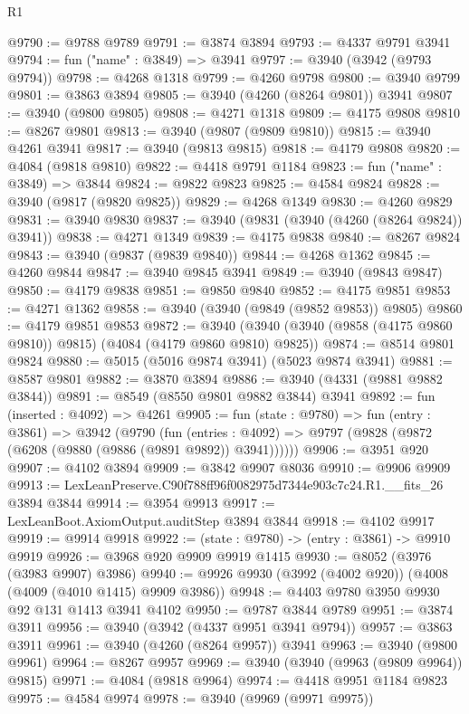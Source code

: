 \begin{lexlean}{R1}
\begin{coremodule}
@9790 := @9788 @9789
@9791 := @3874 @3894
@9793 := @4337 @9791 @3941
@9794 := fun ("name" : @3849) => @3941
@9797 := @3940 (@3942 (@9793 @9794))
@9798 := @4268 @1318
@9799 := @4260 @9798
@9800 := @3940 @9799
@9801 := @3863 @3894
@9805 := @3940 (@4260 (@8264 @9801)) @3941
@9807 := @3940 (@9800 @9805)
@9808 := @4271 @1318
@9809 := @4175 @9808
@9810 := @8267 @9801
@9813 := @3940 (@9807 (@9809 @9810))
@9815 := @3940 @4261 @3941
@9817 := @3940 (@9813 @9815)
@9818 := @4179 @9808
@9820 := @4084 (@9818 @9810)
@9822 := @4418 @9791 @1184
@9823 := fun ("name" : @3849) => @3844
@9824 := @9822 @9823
@9825 := @4584 @9824
@9828 := @3940 (@9817 (@9820 @9825))
@9829 := @4268 @1349
@9830 := @4260 @9829
@9831 := @3940 @9830
@9837 := @3940 (@9831 (@3940 (@4260 (@8264 @9824)) @3941))
@9838 := @4271 @1349
@9839 := @4175 @9838
@9840 := @8267 @9824
@9843 := @3940 (@9837 (@9839 @9840))
@9844 := @4268 @1362
@9845 := @4260 @9844
@9847 := @3940 @9845 @3941
@9849 := @3940 (@9843 @9847)
@9850 := @4179 @9838
@9851 := @9850 @9840
@9852 := @4175 @9851
@9853 := @4271 @1362
@9858 := @3940 (@3940 (@9849 (@9852 @9853)) @9805)
@9860 := @4179 @9851 @9853
@9872 := @3940 (@3940 (@3940 (@9858 (@4175 @9860 @9810)) @9815) (@4084 (@4179 @9860 @9810) @9825))
@9874 := @8514 @9801 @9824
@9880 := @5015 (@5016 @9874 @3941) (@5023 @9874 @3941)
@9881 := @8587 @9801
@9882 := @3870 @3894
@9886 := @3940 (@4331 (@9881 @9882 @3844))
@9891 := @8549 (@8550 @9801 @9882 @3844) @3941
@9892 := fun (inserted : @4092) => @4261
@9905 := fun (state : @9780) =>
  fun (entry : @3861) =>
  @3942
    (@9790
      (fun (entries : @4092) => @9797 (@9828 (@9872 (@6208 (@9880 (@9886 (@9891 @9892)) @3941))))))
@9906 := @3951 @920
@9907 := @4102 @3894
@9909 := @3842 @9907 @8036
@9910 := @9906 @9909
@9913 := LexLeanPreserve.C90f788ff96f0082975d7344e903c7c24.R1.__fits_26 @3894 @3844
@9914 := @3954 @9913
@9917 := LexLeanBoot.AxiomOutput.auditStep @3894 @3844
@9918 := @4102 @9917
@9919 := @9914 @9918
@9922 := (state : @9780) -> (entry : @3861) -> @9910 @9919
@9926 := @3968 @920 @9909 @9919 @1415
@9930 := @8052 (@3976 (@3983 @9907) @3986)
@9940 := @9926 @9930 (@3992 (@4002 @920)) (@4008 (@4009 (@4010 @1415) @9909 @3986))
@9948 := @4403 @9780 @3950 @9930 @92 @131 @1413 @3941 @4102
@9950 := @9787 @3844 @9789
@9951 := @3874 @3911
@9956 := @3940 (@3942 (@4337 @9951 @3941 @9794))
@9957 := @3863 @3911
@9961 := @3940 (@4260 (@8264 @9957)) @3941
@9963 := @3940 (@9800 @9961)
@9964 := @8267 @9957
@9969 := @3940 (@3940 (@9963 (@9809 @9964)) @9815)
@9971 := @4084 (@9818 @9964)
@9974 := @4418 @9951 @1184 @9823
@9975 := @4584 @9974
@9978 := @3940 (@9969 (@9971 @9975))

\end{coremodule}
\end{lexlean}

